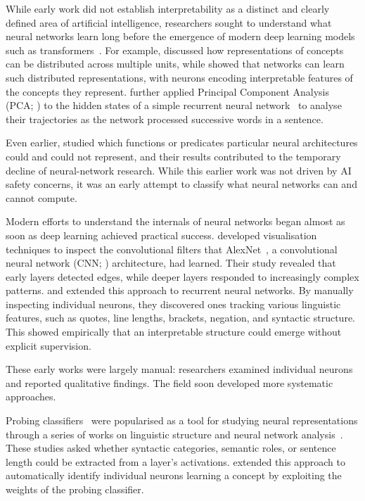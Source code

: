 While early work did not establish interpretability as a distinct and clearly defined area of artificial intelligence, researchers sought to understand what neural networks learn long before the emergence of modern deep learning models such as transformers~. For example,  discussed how representations of concepts can be distributed across multiple units, while  showed that networks can learn such distributed representations, with neurons encoding interpretable features of the concepts they represent.  further applied Principal Component Analysis (PCA; ) to the hidden states of a simple recurrent neural network~ to analyse their trajectories as the network processed successive words in a sentence.

Even earlier,  studied which functions or predicates particular neural architectures could and could not represent, and their results contributed to the temporary decline of neural-network research. 
While this earlier work was not driven by AI safety concerns, it was an early attempt to classify what neural networks can and cannot compute.

Modern efforts to understand the internals of neural networks began almost as soon as deep learning achieved practical success.  developed visualisation techniques to inspect the convolutional filters that AlexNet~, a convolutional neural network (CNN; ) architecture, had learned. Their study revealed that early layers detected edges, while deeper layers responded to increasingly complex patterns.  and  extended this approach to recurrent neural networks. By manually inspecting individual neurons, they discovered ones tracking various linguistic features, such as quotes, line lengths, brackets, negation, and syntactic structure. This showed empirically that an interpretable structure could emerge without explicit supervision.

These early works were largely manual: researchers examined individual neurons and reported qualitative findings. The field soon developed more systematic approaches. 

Probing classifiers~ were popularised as a tool for studying neural representations through a series of works on linguistic structure and neural network analysis~. These studies asked whether syntactic categories, semantic roles, or sentence length could be extracted from a layer's activations.  extended this approach to automatically identify individual neurons learning a concept by exploiting the weights of the probing classifier. %


